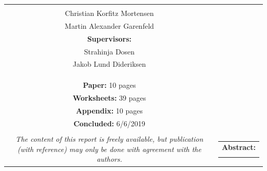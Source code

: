 \begin{titlepage}
\begin{nopagebreak}
{\begin{tabular}{cc}
{{						\textbf{Participants:}\\
						Christian Korfitz Mortensen\\
						Martin Alexander Garenfeld\\
						
						
						
						\textbf{Supervisors:}\\
						Strahinja Dosen\\
						Jakob Lund Dideriksen\\
						
						
					}\\
					\\
					\\
					\textbf{Paper:} 10 pages \\
					\textbf{Worksheets:} 39 pages \\ 
					\textbf{Appendix:} 10 pages \\
					\textbf{Concluded:} 6/6/2019\\
					\\
					\textit{The content of this report is freely available, but publication (with reference) may only be done with
						agreement with the authors.}
					\vfill } &
				\parbox{7cm}{
					\vspace{-.55cm}
					\hfill
					\vspace{.55cm}
					\begin{tabular}{l}
						{\textbf{Abstract:}} \\
						\fbox{
							\parbox{8.5cm}{\bigskip
								{\vfill{\small 
										\bigskip}}
						}}
				\end{tabular}}
		\end{tabular}} %
		
		
		
	\end{nopagebreak}
\end{titlepage}
%